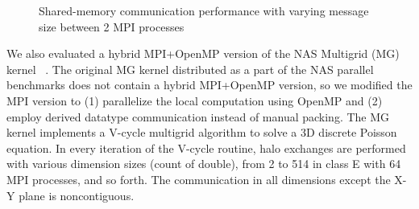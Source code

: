 \begin{figure}
\begin{center}
\end{center}
\vspace{-5.0ex}
\caption{Shared-memory communication performance with varying message
  size between 2 MPI processes}
\vspace{-3.0ex}
\label{fig:eva-lmt}
\end{figure}

We also evaluated a hybrid MPI+OpenMP version of the NAS Multigrid
(MG) kernel~\cite{npb} .  The original MG kernel distributed as a part
of the NAS parallel benchmarks does not contain a hybrid MPI+OpenMP
version, so we modified the MPI version to (1) parallelize the local
computation using OpenMP and (2) employ derived datatype communication
instead of manual packing.  The MG kernel implements a V-cycle
multigrid algorithm to solve a 3D discrete Poisson equation.  In every
iteration of the V-cycle routine, halo exchanges are performed with
various dimension sizes (count of double), from 2 to 514 in class E
with 64 MPI processes, and so forth.  The communication in all
dimensions except the X-Y plane is noncontiguous.


